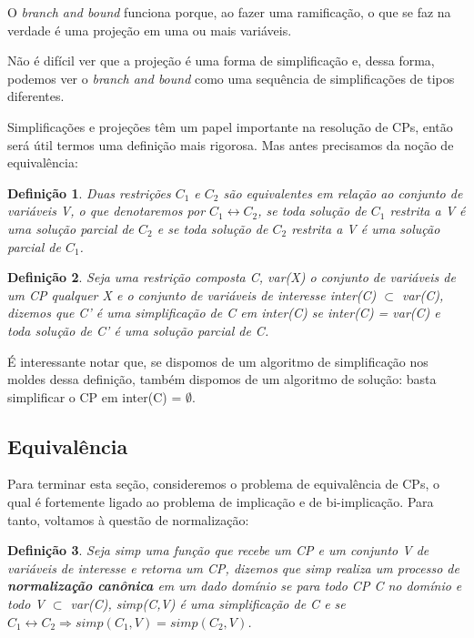 \documentclass{article}
\newtheorem{definition}{Definição}[section]
\theoremstyle{remark}
\theoremstyle{theorem}
\begin{document}
O \textit{branch and bound} funciona porque, ao fazer uma ramificação, o que se faz na verdade é uma projeção em uma ou mais variáveis.

Não é difícil ver que a projeção é uma forma de simplificação e, dessa forma, podemos ver o \textit{branch and bound} como uma sequência de simplificações de tipos diferentes.

Simplificações e projeções têm um papel importante na resolução de CPs, então será útil termos uma definição mais rigorosa. Mas antes precisamos da noção de equivalência:

\begin{definition}
  Duas restrições $C_1$ e $C_2$ são equivalentes em relação ao conjunto de variáveis V, o que denotaremos por $C_1 \leftrightarrow C_2$, se toda solução de $C_1$ restrita a V é uma solução parcial de $C_2$ e se toda solução de $C_2$ restrita a V é uma solução parcial de $C_1$.
\end{definition}

\begin{definition}
  Seja uma restrição composta C, var(X) o conjunto de variáveis de um CP qualquer X e o conjunto de variáveis de interesse inter(C) $\subset$ var(C), dizemos que C' é uma simplificação de C em inter(C) se inter(C) = var(C) e toda solução de C' é uma solução parcial de C.
\end{definition}

É interessante notar que, se dispomos de um algoritmo de simplificação nos moldes dessa definição, também dispomos de um algoritmo de solução: basta simplificar o CP em inter(C) = $\emptyset$.

\subsection{Equivalência}

  Para terminar esta seção, consideremos o problema de equivalência de CPs, o qual é fortemente ligado ao problema de implicação e de bi-implicação. Para tanto, voltamos à questão de normalização:

  \begin{definition}
    Seja \textit{simp} uma função que recebe um CP e um conjunto V de variáveis de interesse e retorna um CP, dizemos que \textit{simp} realiza um processo de \textbf{normalização canônica} em um dado domínio se para todo CP C no domínio e todo V $\subset$ var(C), simp(C,V) é uma simplificação de C e se $C_1 \leftrightarrow C_2 \Rightarrow simp(C_1,V) = simp(C_2,V)$.
  \end{definition}
\end{document}
